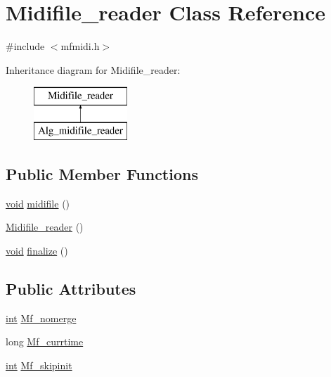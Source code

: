 \hypertarget{class_midifile__reader}{}\section{Midifile\+\_\+reader Class Reference}
\label{class_midifile__reader}


{\ttfamily \#include $<$mfmidi.\+h$>$}

Inheritance diagram for Midifile\+\_\+reader\+:\begin{figure}[H]
\begin{center}
\leavevmode
\includegraphics[height=2.000000cm]{class_midifile__reader}
\end{center}
\end{figure}
\subsection*{Public Member Functions}
\begin{DoxyCompactItemize}
\item 
\hyperlink{sound_8c_ae35f5844602719cf66324f4de2a658b3}{void} \hyperlink{class_midifile__reader_a768f745f5887f79554b74eabea2bf13c}{midifile} ()
\item 
\hyperlink{class_midifile__reader_ad588ac5b000326384bf8116041ec22ff}{Midifile\+\_\+reader} ()
\item 
\hyperlink{sound_8c_ae35f5844602719cf66324f4de2a658b3}{void} \hyperlink{class_midifile__reader_af952c36687f74ad780e3b471f5cb95fe}{finalize} ()
\end{DoxyCompactItemize}
\subsection*{Public Attributes}
\begin{DoxyCompactItemize}
\item 
\hyperlink{xmltok_8h_a5a0d4a5641ce434f1d23533f2b2e6653}{int} \hyperlink{class_midifile__reader_a533ce586d4e859b51f8e6cf90a8a836f}{Mf\+\_\+nomerge}
\item 
long \hyperlink{class_midifile__reader_a8bdc0af34ac8e364730efb3b42e65bdf}{Mf\+\_\+currtime}
\item 
\hyperlink{xmltok_8h_a5a0d4a5641ce434f1d23533f2b2e6653}{int} \hyperlink{class_midifile__reader_af8cf2aa2d241416adf1d235b12d1c4c7}{Mf\+\_\+skipinit}
\end{DoxyCompactItemize}
